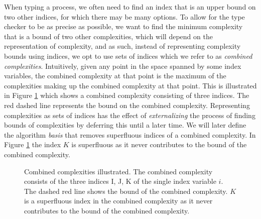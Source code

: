 When typing a process, we often need to find an index that is an upper bound on two other indices, for which there may be many options. To allow for the type checker to be as precise as possible, we want to find the minimum complexity that is a bound of two other complexities, which will depend on the representation of complexity, and as such, instead of representing complexity bounds using indices, we opt to use sets of indices which we refer to as \textit{combined complexities}. Intuitively, given any point in the space spanned by some index variables, the combined complexity at that point is the maximum of the complexities making up the combined complexity at that point. This is illustrated in Figure \ref{fig:combined_complexity} which shows a combined complexity consisting of three indices. The red dashed line represents the bound on the combined complexity. Representing complexities as sets of indices has the effect of \textit{externalizing} the process of finding bounds of complexities by deferring this until a later time. We will later define the algorithm \textit{basis} that removes superfluous indices of a combined complexity. In Figure \ref{fig:combined_complexity} the index $K$ is superfluous as it never contributes to the bound of the combined complexity.

\begin{figure}
    \centering
    
    \caption{Combined complexities illustrated. The combined complexity consists of the three indices I, J, K of the single index variable $i$. The dashed red line shows the bound of the combined complexity. $K$ is a superfluous index in the combined complexity as it never contributes to the bound of the combined complexity.}
    \label{fig:combined_complexity}
\end{figure}


